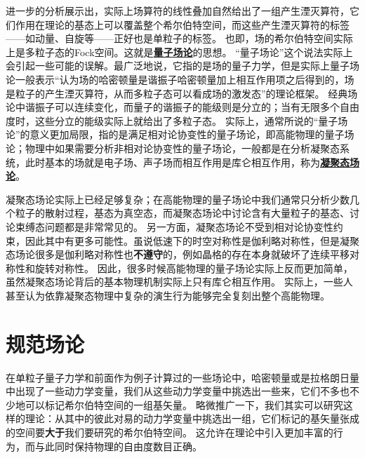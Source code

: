 \documentclass[hyperref, UTF8, a4paper]{ctexbook}
\newcommand{\concept}[1]{\underline{\textbf{#1}}}
\renewcommand{\emph}{\textbf}
\begin{document}
进一步的分析展示出，实际上场算符的线性叠加自然给出了一组产生湮灭算符，它们作用在理论的基态上可以覆盖整个希尔伯特空间，而这些产生湮灭算符的标签——如动量、自旋等——正好也是单粒子的标签。
也即，场的希尔伯特空间实际上是多粒子态的Fock空间。这就是\concept{量子场论}的思想。
“量子场论”这个说法实际上会引起一些可能的误解。最广泛地说，它指的是场的量子力学，但是实际上量子场论一般表示“认为场的哈密顿量是谐振子哈密顿量加上相互作用项之后得到的，场是粒子的产生湮灭算符，从而多粒子态可以看成场的激发态”的理论框架。
经典场论中谐振子可以连续变化，而量子的谐振子的能级则是分立的；当有无限多个自由度时，这些分立的能级实际上就给出了多粒子态。
实际上，通常所说的“量子场论”的意义更加局限，指的是满足相对论协变性的量子场论，即高能物理的量子场论；物理中如果需要分析非相对论协变性的量子场论，一般都是在分析凝聚态系统，此时基本的场就是电子场、声子场而相互作用是库仑相互作用，称为\concept{凝聚态场论}。

凝聚态场论实际上已经足够复杂；在高能物理的量子场论中我们通常只分析少数几个粒子的散射过程，基态为真空态，而凝聚态场论中讨论含有大量粒子的基态、讨论束缚态问题都是非常常见的。
另一方面，凝聚态场论不受到相对论协变性约束，因此其中有更多可能性。虽说低速下的时空对称性是伽利略对称性，但是凝聚态场论很多是伽利略对称性也\emph{不遵守}的，例如晶格的存在本身就破坏了连续平移对称性和旋转对称性。
因此，很多时候高能物理的量子场论实际上反而更加简单，虽然凝聚态场论背后的基本物理机制实际上只有库仑相互作用。
实际上，一些人甚至认为依靠凝聚态物理中复杂的演生行为能够完全复刻出整个高能物理。







\part{规范场论}

在单粒子量子力学和前面作为例子计算过的一些场论中，哈密顿量或是拉格朗日量中出现了一些动力学变量，我们从这些动力学变量中挑选出一些来，它们不多也不少地可以标记希尔伯特空间的一组基矢量。
略微推广一下，我们其实可以研究这样的理论：从其中的彼此对易的动力学变量中挑选出一组，它们标记的基矢量张成的空间要\emph{大于}我们要研究的希尔伯特空间。
这允许在理论中引入更加丰富的行为，而与此同时保持物理的自由度数目正确。
\end{document}
